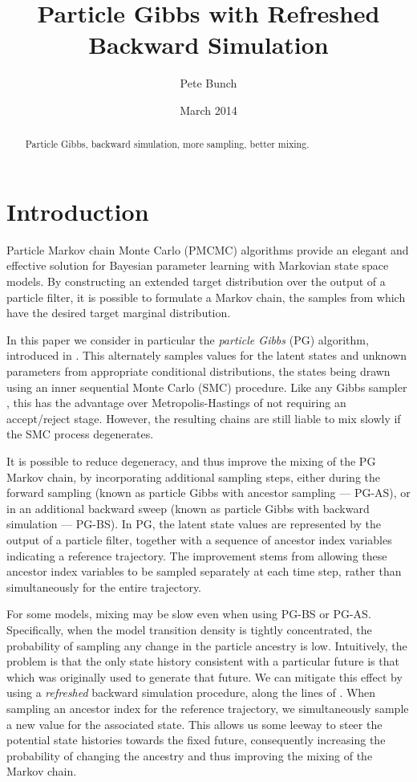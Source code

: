 \documentclass{article}
\title{Particle Gibbs with Refreshed Backward Simulation}
\author{Pete Bunch}
\date{March 2014}
\begin{document}
\maketitle

\begin{abstract}
 Particle Gibbs, backward simulation, more sampling, better mixing.
\end{abstract}


\section{Introduction}
Particle Markov chain Monte Carlo (PMCMC) algorithms \cite{Andrieu2010,Olsson2011,Chopin2013,Lindsten2014} provide an elegant and effective solution for Bayesian parameter learning with Markovian state space models. By constructing an extended target distribution over the output of a particle filter, it is possible to formulate a Markov chain, the samples from which have the desired target marginal distribution.

In this paper we consider in particular the \emph{particle Gibbs} (PG) algorithm, introduced in \cite{Andrieu2010}. This alternately samples values for the latent states and unknown parameters from appropriate conditional distributions, the states being drawn using an inner sequential Monte Carlo (SMC) procedure. Like any Gibbs sampler \cite{Geman1984}, this has the advantage over Metropolis-Hastings \cite{Metropolis1953,Hastings1970} of not requiring an accept/reject stage. However, the resulting chains are still liable to mix slowly if the SMC process degenerates.

It is possible to reduce degeneracy, and thus improve the mixing of the PG Markov chain, by incorporating additional sampling steps, either during the forward sampling \cite{Lindsten2014} (known as particle Gibbs with ancestor sampling --- PG-AS), or in an additional backward sweep \cite{Whiteley2010b,Lindsten2012} (known as particle Gibbs with backward simulation --- PG-BS). In PG, the latent state values are represented by the output of a particle filter, together with a sequence of ancestor index variables indicating a reference trajectory. The improvement stems from allowing these ancestor index variables to be sampled separately at each time step, rather than simultaneously for the entire trajectory.

For some models, mixing may be slow even when using PG-BS or PG-AS. Specifically, when the model transition density is tightly concentrated, the probability of sampling any change in the particle ancestry is low. Intuitively, the problem is that the only state history consistent with a particular future is that which was originally used to generate that future. We can mitigate this effect by using a \emph{refreshed} backward simulation procedure, along the lines of \cite{Bunch2013}. When sampling an ancestor index for the reference trajectory, we simultaneously sample a new value for the associated state. This allows us some leeway to steer the potential state histories towards the fixed future, consequently increasing the probability of changing the ancestry and thus improving the mixing of the Markov chain.
\end{document}
